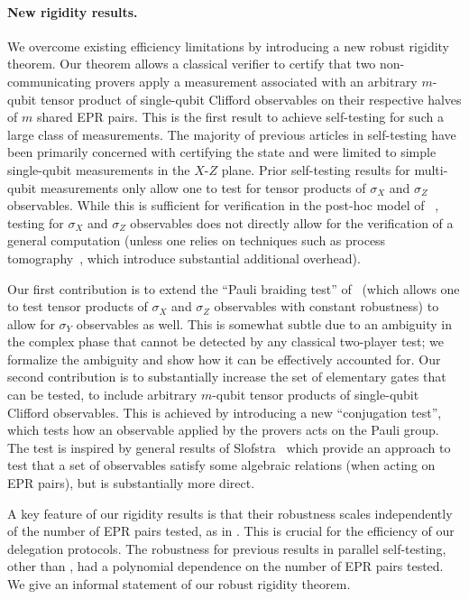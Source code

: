 \documentclass{toc}
\begin{document}
\paragraph{New rigidity results.} 
We overcome existing efficiency limitations by introducing a new robust rigidity theorem. Our theorem allows a classical verifier to certify that two non-communicating provers apply a measurement associated with an arbitrary $m$-qubit tensor product of single-qubit Clifford observables on their respective halves of $m$ shared EPR pairs.
This is the first result to achieve self-testing for such a large class of
measurements. The majority of previous %
articles  %
in self-testing have been primarily
concerned with certifying the state and were limited to simple single-qubit
measurements in the $X$-$Z$ plane. Prior self-testing results for multi-qubit
measurements only allow one to test for tensor products of $\sigma_X$ and $\sigma_Z$
observables. While this is sufficient for verification in the post-hoc model
of~\cite{hajdusek2015posthoc-updated, FHM18}%
, testing for $\sigma_X$ and $\sigma_Z$ observables
does not directly allow for the verification of a general computation (unless
one relies on techniques such as process
tomography~\cite{reichardt2012classical}, which introduce substantial additional
overhead).  

Our first contribution is to extend the ``Pauli braiding test'' of~\cite{natarajan2016robust} (which allows one to test tensor products of $\sigma_X$ and $\sigma_Z$ observables with constant robustness) to allow for $\sigma_Y$ observables as well. This is somewhat subtle due to an ambiguity in the complex phase that cannot be detected by any classical two-player test; we formalize the ambiguity and show how it can be effectively accounted for. Our second contribution is to substantially increase the set of elementary gates that can be tested, to include arbitrary $m$-qubit tensor products of single-qubit Clifford observables. This is achieved by introducing a new ``conjugation test'', which tests how an observable applied by the provers acts on the Pauli group. The test is inspired by general results of Slofstra~\cite{slofstra2016tsirelson} which provide an approach to test that a set of observables satisfy some algebraic relations (when acting on EPR pairs), but is substantially more direct. 

 A key feature of our rigidity results is that their robustness scales independently of the number of EPR pairs tested, as in \cite{natarajan2016robust}. This is crucial for the efficiency of our delegation protocols. The robustness for previous results in parallel self-testing, other than \cite{natarajan2016robust}, had a polynomial dependence on the number of EPR pairs tested. We give an informal statement of our robust rigidity theorem.
 
\end{document}
